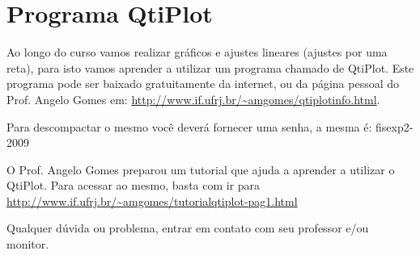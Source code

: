 \chapter{Programa QtiPlot}\label{QtiPlot}

\vspace{-0.7cm}

Ao longo do curso vamos realizar gráficos e ajustes lineares (ajustes por uma reta), para isto vamos aprender a utilizar um programa chamado de QtiPlot.  Este programa pode ser baixado gratuitamente da internet, ou da página pessoal do Prof. Angelo Gomes em: 
\url{http://www.if.ufrj.br/~amgomes/qtiplotinfo.html}. 

Para descompactar o mesmo você deverá fornecer uma senha, a mesma é: fisexp2-2009

O Prof. Angelo Gomes preparou um tutorial que ajuda a aprender a utilizar o QtiPlot. Para acessar ao mesmo, basta com ir para \\
\url{http://www.if.ufrj.br/~amgomes/tutorialqtiplot-pag1.html}

Qualquer dúvida ou problema, entrar em contato com seu professor e/ou monitor.

